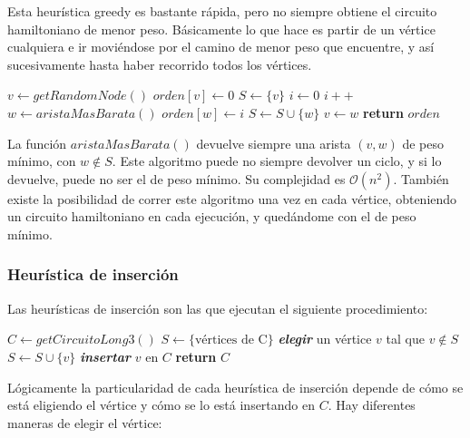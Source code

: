 Esta heur\'istica greedy es bastante r\'apida, pero no siempre obtiene el circuito hamiltoniano de menor peso. B\'asicamente lo que hace es partir de un v\'ertice cualquiera e ir movi\'endose por el camino de menor peso que encuentre, y as\'i sucesivamente hasta haber recorrido todos los v\'ertices.

\begin{algorithm}
\begin{algorithmic}[1]
  \State $v \gets getRandomNode()$
  \State $orden[v] \gets 0$
  \State $S \gets \{v\}$
  \State $i \gets 0$
    \State $i++$
    \State $w \gets aristaMasBarata()$
    \State $orden[w] \gets i$
    \State $S \gets S \cup \{ w \}$
    \State $v \gets w$
  \EndWhile
  \State \textbf{return} $orden$
\EndFunction
\end{algorithmic}
\end{algorithm}

La funci\'on $aristaMasBarata()$ devuelve siempre una arista $(v,w)$ de peso m\'inimo, con $w \not\in S$. Este algoritmo puede no siempre devolver un ciclo, y si lo devuelve, puede no ser el de peso m\'inimo. Su complejidad es $\mathcal{O}(n^2)$. Tambi\'en existe la posibilidad de correr este algoritmo una vez en cada v\'ertice, obteniendo un circuito hamiltoniano en cada ejecuci\'on, y qued\'andome con el de peso m\'inimo.

\newpage
\subsubsection*{Heur\'istica de inserci\'on}

Las heur\'isticas de inserci\'on son las que ejecutan el siguiente procedimiento:

\begin{algorithm}
\begin{algorithmic}[1]
\State $C \gets getCircuitoLong3()$
\State $S \gets \{ \textrm{v\'ertices de C} \}$
  \State \textbf{\emph{elegir}} un v\'ertice $v$ tal que $v \not\in S$
  \State $S \gets S \cup \{ v \}$
  \State \textbf{\emph{insertar}} $v$ en $C$
\EndWhile
\State \textbf{return} $C$
\end{algorithmic}
\end{algorithm}

L\'ogicamente la particularidad de cada heur\'istica de inserci\'on depende de c\'omo se est\'a eligiendo el v\'ertice y c\'omo se lo est\'a insertando en $C$. Hay diferentes maneras de elegir el v\'ertice:

